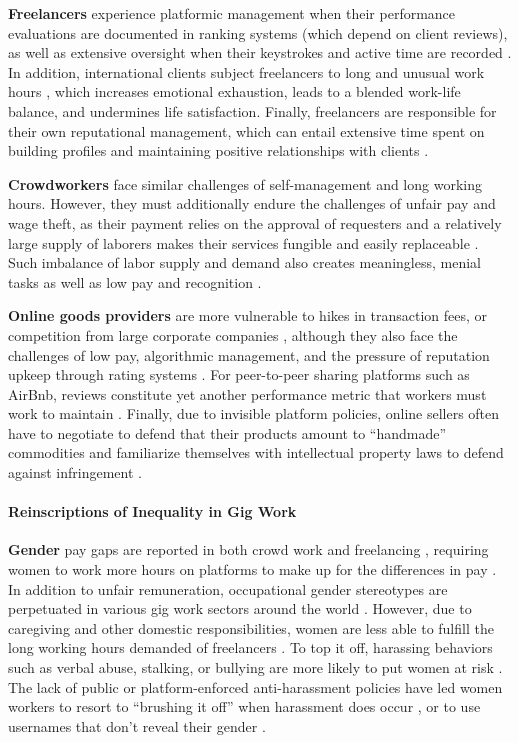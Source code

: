 \textbf{Freelancers} experience platformic management when their performance evaluations are documented in ranking systems (which depend on client reviews), as well as extensive oversight when their keystrokes and active time are recorded \cite{alvarez2022design}. In addition, international clients subject freelancers to long and unusual work hours \cite{Shevchuk2021-qh,Shevchuk_Strebkov_Davis_2019}, which increases emotional exhaustion, leads to a blended work-life balance, and undermines life satisfaction. Finally, freelancers are responsible for their own reputational management, which can entail extensive time spent on building profiles and maintaining positive relationships with clients \cite{Kitamura2021-gh,personal}.

\textbf{Crowdworkers} face similar challenges of self-management and long working hours. However, they must additionally endure the challenges of unfair pay \cite{Barbosa2019-kp} and wage theft, as their payment relies on the approval of requesters and a relatively large supply of laborers makes their services fungible and easily replaceable \cite{irani2013turkopticon}. Such imbalance of labor supply and demand also creates meaningless, menial tasks as well as low pay and recognition \cite{Kittur2013-jd,Durward2020-vh}.

\textbf{Online goods providers} are more vulnerable to hikes in transaction fees, or competition from large corporate companies \cite{West_undated-no}, although they also face the challenges of low pay, algorithmic management, and the pressure of reputation upkeep through rating systems \cite{Benson2020-it}. For peer-to-peer sharing platforms such as AirBnb, reviews constitute yet another performance metric that workers must work to maintain \cite{Lawani2019-ry}. Finally, due to invisible platform policies, online sellers often have to negotiate to defend that their products amount to ``handmade'' commodities and familiarize themselves with intellectual property laws to defend against infringement \cite{Razaq2022-lq}. 

\paragraph{Reinscriptions of Inequality in Gig Work} \text
\newline
\textbf{Gender} pay gaps are reported in both crowd work and freelancing \cite{Dunn2021-hq,foong2021understanding,Dubey2017-fy,Litman_undated-kh}, requiring women to work more hours on platforms to make up for the differences in pay \cite{Barzilay2016-yl}. In addition to unfair remuneration, occupational gender stereotypes are perpetuated in various gig work sectors around the world \cite{Galperin2021-eh,good}. However, due to caregiving and other domestic responsibilities, women are less able to fulfill the long working hours demanded of freelancers \cite{Adams-Prassl2017-co}. To top it off, harassing behaviors such as verbal abuse, stalking, or bullying are more likely to put women at risk \cite{Rosenblat2017-bm}. The lack of public or platform-enforced anti-harassment policies have led women workers to resort to ``brushing it off'' when harassment does occur \cite{ma2022brush}, or to use usernames that don't reveal their gender \cite{Kasliwal2020-zg}.

